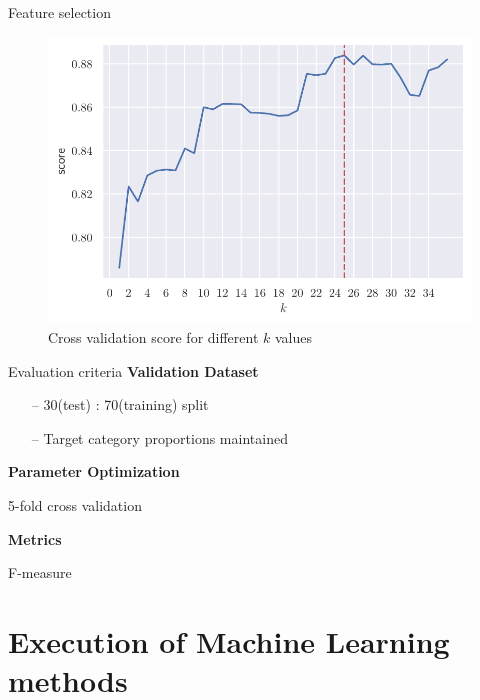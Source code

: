 \documentclass[aspectratio=169]{beamer}
\begin{document}
\begin{frame}{Feature selection}
    \vspace{0.75cm}
    \begin{figure}[H]
        \centering
        \includegraphics[width=0.5\linewidth]{kbest}
        \caption{Cross validation score for different $k$ values}%
        \label{fig:feature_cross}
    \end{figure}
\end{frame}

\begin{frame}{Evaluation criteria}
    \textbf{Validation Dataset}
    \small
    \begin{itemize}
    	\item[--] 30(test) : 70(training) split
    	\item[--] Target category proportions maintained
    \end{itemize}
    \normalsize

    \textbf{Parameter Optimization}

    \small
    5-fold cross validation

    \normalsize
    \textbf{Metrics}

    \small
    F-measure
    \normalsize
\end{frame}

\section{Execution of Machine Learning methods}
\end{document}
